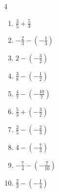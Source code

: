 


\setcounter{quesnum}{40}

\begin{multicols}{4}
\begin{enumerate}
  \itemsep=18pt
  \item $\displaystyle \frac{3}{5} + \frac{5}{3}$


  \item $\displaystyle -\frac{2}{3} - \left(-\frac{1}{3}\right)$


  \item $\displaystyle 2 - \left(-\frac{3}{2}\right)$


  \item $\displaystyle \frac{3}{8} - \left(-\frac{1}{2}\right)$


  \item $\displaystyle \frac{4}{7} - \left(-\frac{10}{7}\right)$

        \phantom{$\displaystyle =2$}

  \item $\displaystyle \frac{5}{3} + \left(-\frac{3}{2}\right)$


  \item $\displaystyle \frac{2}{5} - \left(-\frac{2}{3}\right)$


  \item $\displaystyle 4 - \left(-\frac{7}{3}\right)$


  \item $\displaystyle -\frac{7}{4} - \left(-\frac{7}{10}\right)$


  \item $\displaystyle \frac{2}{3} - \left(-\frac{1}{4}\right)$



\end{enumerate}
\end{multicols}
